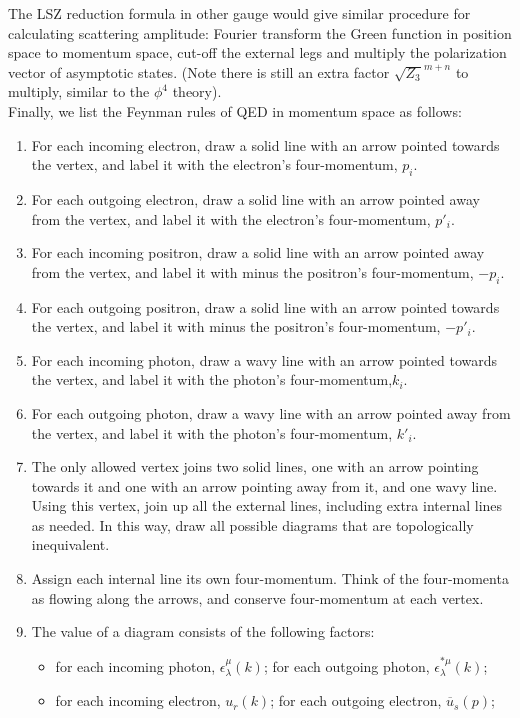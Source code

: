 \noindent
The LSZ reduction formula in other gauge would give similar procedure for calculating scattering amplitude: Fourier transform the Green function in position space to momentum space, cut-off the external legs and multiply the polarization vector of asymptotic states. (Note there is still an extra factor $\sqrt{Z_3}^{m+n}$ to multiply, similar to the $\phi^4$ theory).
\\
Finally, we list the Feynman rules of QED in momentum space as follows:
\begin{enumerate}
\item For each incoming electron, draw a solid line with an arrow pointed towards the vertex, and label it with the electron's four-momentum, $p_i$.
\item For each outgoing electron, draw a solid line with an arrow pointed away from the vertex, and label it with the electron's four-momentum, $p'_i$.
\item For each incoming positron, draw a solid line with an arrow pointed away from the vertex, and label it with minus the positron's four-momentum, $-p_i$.
\item For each outgoing positron, draw a solid line with an arrow pointed towards the vertex, and label it with minus the positron's four-momentum, $-p'_i$.
\item For each incoming photon, draw a wavy line with an arrow pointed towards the vertex, and label it with the photon's four-momentum,$k_i$.
\item For each outgoing photon, draw a wavy line with an arrow pointed away from the vertex, and label it with the photon's four-momentum, $k'_i$.
\item The only allowed vertex joins two solid lines, one with an arrow pointing towards it and one with an arrow pointing away from it, and one wavy line. Using this vertex, join up all the external lines, including extra internal lines as needed. In this way, draw all possible diagrams that are topologically inequivalent.
\item Assign each internal line its own four-momentum. Think of the four-momenta as flowing along the arrows, and conserve four-momentum at each vertex. 
\item The value of a diagram consists of the following factors:
\begin{itemize}
\item for each incoming photon, $\epsilon^{\mu}_{\lambda}(k)$; 
for each outgoing photon, $\epsilon^{*\mu}_{\lambda}(k)$;
\item for each incoming electron, $u_{r}(k)$; for each outgoing electron, $\overline{u}_{s}(p)$;

\end{itemize}
\end{enumerate}
